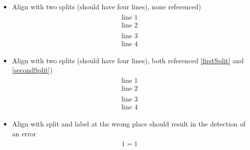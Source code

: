 \documentclass{article}
\begin{document}
\begin{itemize}
		\item Align with two splits (should have four lines), none referenced)
			\begin{align}
				\begin{split}
					\text{line 1}
					\\
					\text{line 2}
				\end{split}
				\\
				\begin{split}
					\text{line 3}
					\\
					\text{line 4}
				\end{split}
			\end{align}
		\item Align with two splits (should have four lines), both referenced \ref{firstSplit} and \ref{secondSplit})
			\begin{align}
				\label{firstSplit}
				\begin{split}
					\text{line 1}
					\\
					\text{line 2}
				\end{split}
				\\
				\label{secondSplit}
				\begin{split}
					\text{line 3}
					\\
					\text{line 4}
				\end{split}
			\end{align}
		\item Align with split and label at the wrong place should result in the detection of an error
			{
				\def\PackageError#1#2#3{\\\text{Package error successfully detected.}}%
				\begin{align}
					\begin{split}
						1 = 1
					\end{split}
					\label{problematicLabel}
				\end{align}
			}

\end{itemize}
\end{document}
